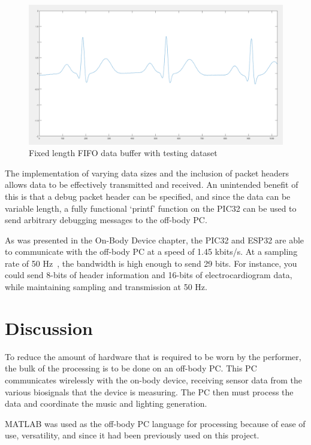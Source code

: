 \begin{figure}[!ht]
  \caption{Fixed length FIFO data buffer with testing dataset}\label{fig:matlab_packet_test2}
  \centering
  \includegraphics[width=1\columnwidth]{chapters/development/MATLAB/FULL_FILLED}
\end{figure}

The implementation of varying data sizes and the inclusion of packet headers allows data to be effectively transmitted and received.
An unintended benefit of this is that a debug packet header can be specified, and since the data can be variable length,
a fully functional `printf' function on the PIC32 can be used to send arbitrary debugging messages to the off-body PC.

As was presented in the On-Body Device chapter, the PIC32 and ESP32 are able to communicate with the off-body PC at a speed of 1.45 kbits/s.
At a sampling rate of 50 Hz~\cite{Ajdaraga:2017}, the bandwidth is high enough to send 29 bits.
For instance, you could send 8-bits of header information and 16-bits of electrocardiogram data, while maintaining sampling and transmission at 50 Hz.


\section{Discussion}
To reduce the amount of hardware that is required to be worn by the performer,
the bulk of the processing is to be done on an off-body PC.
This PC communicates wirelessly with the on-body device,
receiving sensor data from the various biosignals that the device is measuring.
The PC then must process the data and coordinate the music and lighting generation.

MATLAB was used as the off-body PC language for processing because of ease of use, versatility,
and since it had been previously used on this project.

